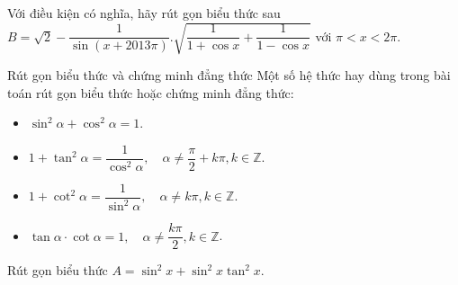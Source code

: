 \begin{bt}%
Với điều kiện có nghĩa, hãy rút gọn biểu thức sau\\
$B  =  \sqrt{2}  -  \dfrac{1}{\sin \left(x  +  2013\pi\right)}.\sqrt{\dfrac{1}{1  +  \cos x}  +  \dfrac{1}{1  -  \cos x}}$ với $\pi  <  x  <  2\pi$.
\end{bt}

\begin{dang}{Rút gọn biểu thức và chứng minh đẳng thức}
Một số hệ thức hay dùng trong bài toán rút gọn biểu thức hoặc chứng minh đẳng thức:
\begin{itemize}
\item $\sin ^2 \alpha + \cos^2 \alpha = 1$.
\item $1+\tan^2 \alpha = \dfrac{1}{\cos^2 \alpha}, \quad \alpha \neq \dfrac{\pi}{2}+k\pi, k \in \mathbb{Z}$.
\item $1+\cot^2 \alpha = \dfrac{1}{\sin^2 \alpha}, \quad \alpha \neq k\pi, k \in \mathbb{Z}$.
\item $\tan \alpha \cdot \cot \alpha = 1, \quad \alpha \neq \dfrac{k\pi}{2}, k \in \mathbb{Z}$.
\end{itemize}
\end{dang}
\setcounter{vd}{0}
\begin{vd}%
Rút gọn biểu thức $A= \sin ^2x+ \sin ^2x \tan ^2x$.
\end{vd}

